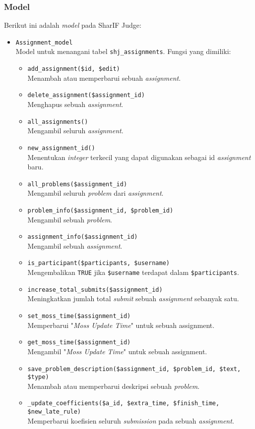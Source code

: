 \subsubsection{Model}

Berikut ini adalah \textit{model} pada SharIF Judge:

\begin{itemize}
	\item \verb|Assignment_model| \\ Model untuk menangani tabel \verb|shj_assignments|. Fungsi yang dimiliki:
	\begin{itemize}
		\item \verb|add_assignment($id, $edit)|\\ Menambah atau memperbarui sebuah \textit{assignment}.
		\item \verb|delete_assignment($assignment_id)| \\ Menghapus sebuah \textit{assignment}.
		\item \verb|all_assignments()| \\ Mengambil seluruh \textit{assignment}.
		\item \verb|new_assignment_id()| \\ Menentukan \textit{integer} terkecil yang dapat digunakan sebagai id \textit{assignment} baru.
		\item \verb|all_problems($assignment_id)| \\ Mengambil seluruh \textit{problem} dari \textit{assignment}.
		\item \verb|problem_info($assignment_id, $problem_id)| \\ Mengambil sebuah \textit{problem}.
		\item \verb|assignment_info($assignment_id)| \\ Mengambil sebuah \textit{assignment}.
		\item \verb|is_participant($participants, $username)| \\ Mengembalikan \verb|TRUE| jika \verb|$username| terdapat dalam \verb|$participants|.
		\item \verb|increase_total_submits($assignment_id)| \\ Meningkatkan jumlah total \textit{submit} sebuah \textit{assignment} sebanyak satu.
		\item \verb|set_moss_time($assignment_id)| \\ Memperbarui "\textit{Moss Update Time}" untuk sebuah assignment.
		\item \verb|get_moss_time($assignment_id)| \\ Mengambil "\textit{Moss Update Time}" untuk sebuah assignment.
		\item \verb|save_problem_description($assignment_id, $problem_id, $text, $type)| \\ Menambah atau memperbarui deskripsi sebuah \textit{problem}.
		\item \verb|_update_coefficients($a_id, $extra_time, $finish_time, $new_late_rule)| \\ Memperbarui koefisien seluruh \textit{submission} pada sebuah \textit{assignment}.
	\end{itemize}
	

\end{itemize}

